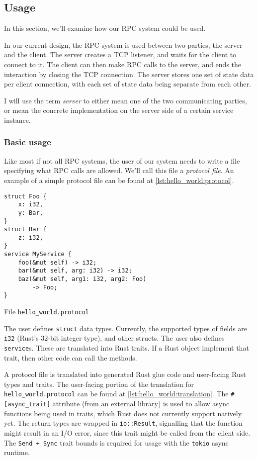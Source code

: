 \documentclass[11pt, twocolumn]{article}
\begin{document}
\subsection{Usage}

In this section, we'll examine how our RPC system could be used.

In our current design, the RPC system is used between two parties, the server and the client. The server creates a TCP listener, and waits for the client to connect to it. The client can then make RPC calls to the server, and ends the interaction by closing the TCP connection. The server stores one set of state data per client connection, with each set of state data being separate from each other.

I will use the term \textit{server} to either mean one of the two communicating parties, or mean the concrete implementation on the server side of a certain service instance.

\subsubsection{Basic usage}

Like most if not all RPC systems, the user of our system needs to write a file specifying what RPC calls are allowed. We'll call this file a \textit{protocol file}. An example of a simple protocol file can be found at \cref{lst:hello_world:protocol}.

\begin{listing}
\begin{verbatim}
struct Foo {
    x: i32,
    y: Bar,
}
struct Bar {
    z: i32,
}
service MyService {
    foo(&mut self) -> i32;
    bar(&mut self, arg: i32) -> i32;
    baz(&mut self, arg1: i32, arg2: Foo)
        -> Foo;
}
\end{verbatim}
\caption{File \texttt{hello\_world.protocol}}
\label{lst:hello_world:protocol}
\end{listing}

The user defines \texttt{struct} data types. Currently, the supported types of fields are \texttt{i32} (Rust's 32-bit integer type), and other structs. The user also defines \texttt{service}s. These are translated into Rust traits. If a Rust object implement that trait, then other code can call the methods.

A protocol file is translated into generated Rust glue code and user-facing Rust types and traits. The user-facing portion of the translation for \texttt{hello\_world.protocol} can be found at \cref{lst:hello_world:translation}. The \texttt{\#[async\_trait]} attribute (from an external library\cite{async-trait}) is used to allow async functions being used in traits, which Rust does not currently support natively yet. The return types are wrapped in \texttt{io::Result}, signalling that the function might result in an I/O error, since this trait might be called from the client side. The \texttt{Send + Sync} trait bounds is required for usage with the \texttt{tokio}\cite{tokio} async runtime.
\end{document}

